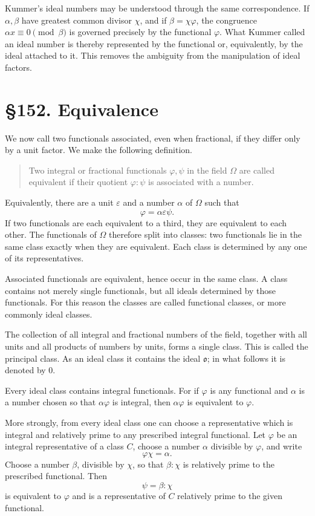 \documentclass[11pt,a4paper]{book}
\newcommand{\webersection}[2]{\clearpage\section*{\S #1. #2}}
\begin{document}
Kummer's ideal numbers may be understood through the same correspondence.  If \(\alpha,\beta\) have greatest common divisor \(\chi\), and if \(\beta=\chi\varphi\), the congruence \(\alpha x\equiv0\pmod{\beta}\) is governed precisely by the functional \(\varphi\).  What Kummer called an ideal number is thereby represented by the functional or, equivalently, by the ideal attached to it.  This removes the ambiguity from the manipulation of ideal factors.

\webersection{152}{Equivalence}

We now call two functionals associated, even when fractional, if they differ only by a unit factor.  We make the following definition.

\begin{quote}
Two integral or fractional functionals \(\varphi,\psi\) in the field \(\Omega\) are called equivalent if their quotient \(\varphi:
\psi\) is associated with a number.
\end{quote}
Equivalently, there are a unit \(\varepsilon\) and a number \(\alpha\) of \(\Omega\) such that
\begin{equation}
 \varphi=\alpha\varepsilon\psi. \tag{1}
\end{equation}
If two functionals are each equivalent to a third, they are equivalent to each other.  The functionals of \(\Omega\) therefore split into classes: two functionals lie in the same class exactly when they are equivalent.  Each class is determined by any one of its representatives.

Associated functionals are equivalent, hence occur in the same class.  A class contains not merely single functionals, but all ideals determined by those functionals.  For this reason the classes are called functional classes, or more commonly ideal classes.

The collection of all integral and fractional numbers of the field, together with all units and all products of numbers by units, forms a single class.  This is called the principal class.  As an ideal class it contains the ideal \(\mathfrak o\); in what follows it is denoted by \(0\).

Every ideal class contains integral functionals.  For if \(\varphi\) is any functional and \(\alpha\) is a number chosen so that \(\alpha\varphi\) is integral, then \(\alpha\varphi\) is equivalent to \(\varphi\).

More strongly, from every ideal class one can choose a representative which is integral and relatively prime to any prescribed integral functional.  Let \(\varphi\) be an integral representative of a class \(C\), choose a number \(\alpha\) divisible by \(\varphi\), and write
\begin{equation}
 \varphi\chi=\alpha. \tag{2}
\end{equation}
Choose a number \(\beta\), divisible by \(\chi\), so that \(\beta:
\chi\) is relatively prime to the prescribed functional.  Then
\begin{equation}
 \psi=\beta:
\chi \tag{3}
\end{equation}
is equivalent to \(\varphi\) and is a representative of \(C\) relatively prime to the given functional.
\end{document}
